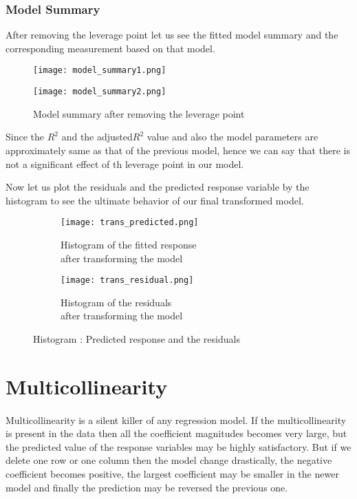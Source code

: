 \documentclass[A4paper,11pt]{report}
\begin{document}
	 \subsubsection{Model Summary}
	 After removing the leverage point let us see the fitted model summary and the corresponding measurement based on that model.  	 
	 \begin{figure}[H]
	 	\texttt{[image: model\_summary1.png]}
	 \end{figure}
	 \begin{figure}[H]
	 	\texttt{[image: model\_summary2.png]}
	 	\caption{Model summary after removing the leverage point}
	 \end{figure}
 	 Since the $R^2$ and the adjusted$R^2$ value and also the model parameters are approximately same as that of the previous model, hence we can say that there is not a significant effect of th leverage point in our model.
	 \par Now let us plot the residuals and the predicted response variable by the histogram to see the ultimate behavior of our final transformed model.
	 \begin{figure}[H]
	 \begin{subfigure}[b]{0.5\textwidth}
	 	\texttt{[image: trans\_predicted.png]}
	 	\caption{Histogram of the fitted response\\ after transforming the model}
	 \end{subfigure}%
 \hfill
	 \begin{subfigure}[b]{0.5\textwidth}
	 	\texttt{[image: trans\_residual.png]}
	 	\caption{Histogram of the residuals\\ after transforming the model}
	 \end{subfigure}
 	 \caption{Histogram : Predicted response and the residuals}
	 \end{figure}
	 \section{Multicollinearity}
	 \paragraph{}\paragraph{}Multicollinearity is a silent killer of any regression model. If the multicollinearity is present in the data then all the coefficient magnitudes becomes very large, but the predicted value of the response variables may be highly satisfactory. But if we delete one row or one column then the model change drastically, the negative coefficient becomes positive, the largest coefficient may be smaller in the newer model and finally the prediction may be reversed the previous one.
\end{document}
